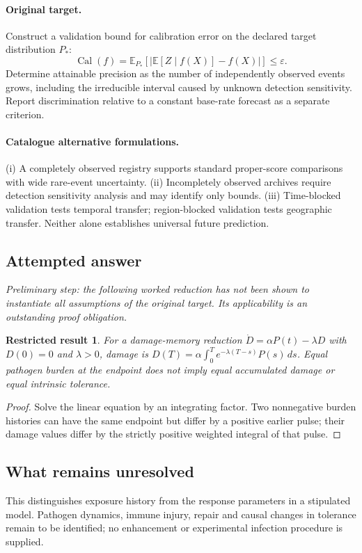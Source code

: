 \documentclass[11pt]{article}
\newcommand{\E}{\mathbb E}
\providecommand{\E}{\mathbb E}
\newtheorem{attemptresult}{Restricted result}[section]
\begin{document}
\paragraph{Original target.}
Construct a validation bound for calibration error on the declared target distribution $P_*$:
    \[\operatorname{Cal}(f)=\E_{P_*}\!\left[\left|\E[Z\mid f(X)]-f(X)\right|\right]\leq\varepsilon.
    \]
    Determine attainable precision as the number of independently observed events grows, including the irreducible interval caused by unknown detection sensitivity. Report discrimination relative to a constant base-rate forecast as a separate criterion.
\paragraph{Catalogue alternative formulations.}
(i) A completely observed registry supports standard proper-score comparisons with wide rare-event uncertainty. (ii) Incompletely observed archives require detection sensitivity analysis and may identify only bounds. (iii) Time-blocked validation tests temporal transfer; region-blocked validation tests geographic transfer. Neither alone establishes universal future prediction.
\subsection{Attempted answer}
\noindent\emph{Preliminary step: the following worked reduction has not been shown to instantiate all assumptions of the original target. Its applicability is an outstanding proof obligation.}

\begin{attemptresult}
For a damage-memory reduction $\dot D=\alpha P(t)-\lambda D$ with $D(0)=0$ and $\lambda>0$, damage is $D(T)=\alpha\int_0^T e^{-\lambda(T-s)}P(s)\,ds$. Equal pathogen burden at the endpoint does not imply equal accumulated damage or equal intrinsic tolerance.
\end{attemptresult}
\begin{proof}
Solve the linear equation by an integrating factor. Two nonnegative burden histories can have the same endpoint but differ by a positive earlier pulse; their damage values differ by the strictly positive weighted integral of that pulse.
\end{proof}
\subsection{What remains unresolved}
This distinguishes exposure history from the response parameters in a stipulated model. Pathogen dynamics, immune injury, repair and causal changes in tolerance remain to be identified; no enhancement or experimental infection procedure is supplied.
\end{document}

